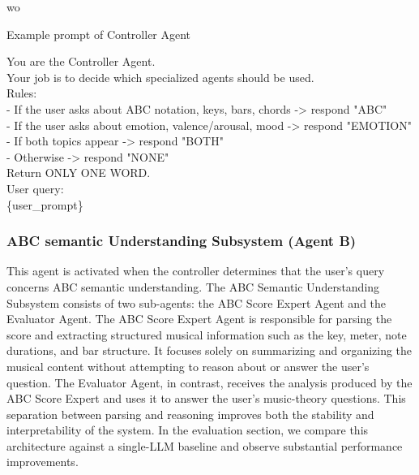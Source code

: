 wo\documentclass[sigconf]{acmart}
\begin{document}
\begin{promptbox}{Example prompt of Controller Agent}


You are the Controller Agent.\\

Your job is to decide which specialized agents should be used.\\

Rules:\\
- If the user asks about ABC notation, keys, bars, chords -> respond "ABC"\\
- If the user asks about emotion, valence/arousal, mood -> respond "EMOTION"\\
- If both topics appear -> respond "BOTH"\\
- Otherwise -> respond "NONE"\\

Return ONLY ONE WORD.\\

User query:\\
\{user\_prompt\}\\
\end{promptbox}



\subsubsection{ABC semantic Understanding Subsystem (Agent B)}
This agent is activated when the controller determines that the user’s query concerns ABC semantic understanding. The ABC Semantic Understanding Subsystem consists of two sub-agents: the ABC Score Expert Agent and the Evaluator Agent. The ABC Score Expert Agent is responsible for parsing the score and extracting structured musical information such as the key, meter, note durations, and bar structure. It focuses solely on summarizing and organizing the musical content without attempting to reason about or answer the user’s question.
The Evaluator Agent, in contrast, receives the analysis produced by the ABC Score Expert and uses it to answer the user’s music-theory questions. This separation between parsing and reasoning improves both the stability and interpretability of the system. In the evaluation section, we compare this architecture against a single-LLM baseline and observe substantial performance improvements.
\end{document}
